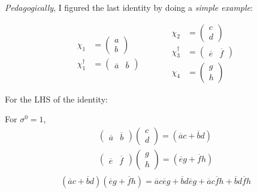 \documentclass[twoside]{amsart}
\begin{document}
\begin{itemize}
\emph{Pedagogically}, I figured the last identity by doing a \emph{simple example}:

\[
\begin{aligned} \chi_1 & = \left( \begin{matrix} a \\ b \end{matrix} \right) \\ \chi_1^{\dag} & = (\begin{matrix} \overline{a} & \overline{b} \end{matrix} ) \end{aligned} \quad \quad \quad \begin{aligned} \chi_2 & = \left( \begin{matrix} c \\ d \end{matrix} \right) \\ \chi_3^{\dag} & = ( \begin{matrix} \overline{e} & \overline{f} \end{matrix} ) \\ \chi_4 & = \left( \begin{matrix} g \\ h \end{matrix} \right) \end{aligned}
\] 

For the LHS of the identity:

For $\sigma^0 =1$, 
\[
\begin{aligned}
  (\begin{matrix} \overline{a} & \overline{b} \end{matrix}) \left( \begin{matrix} c \\ d \end{matrix}  \right) = (\overline{a}c + \overline{b} d ) \\ 
  (\begin{matrix} \overline{e} & \overline{f} \end{matrix}) \left( \begin{matrix} g \\ h \end{matrix}  \right) = (\overline{e}g + \overline{f} h ) \\ 
\end{aligned}
\]
\[
(\overline{a} c + \overline{b} d )(\overline{e} g + \overline{f} h) = \overline{a} c \overline{e} g + \overline{b} d \overline{e} g + \overline{a} c \overline{f} h + \overline{b} d\overline{f} h 
\]


\end{itemize}
\end{document}
